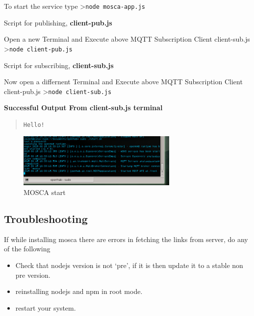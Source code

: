 \documentclass[16pt]{article}
\begin{document}
To start the service type \textgreater{}\texttt{node mosca-app.js}

\vspace{0.5cm}
Script for publishing, \textbf{client-pub.js}

Open a new Terminal and Execute above MQTT Subscription Client
client-sub.js \textgreater{}\texttt{node client-pub.js}

\vspace{0.5cm}
Script for subscribing, \textbf{client-sub.js}

Now open a differnent Terminal and Execute above MQTT Subscription
Client client-pub.js \textgreater{}\texttt{node client-sub.js}

\vspace{0.5cm}
\textbf{Successful Output From client-sub.js terminal}

\begin{quote}
\texttt{Hello!}
\end{quote}


\begin{figure}
\hspace{2cm}
\includegraphics[width=0.7\textwidth]{images/mosca.jpg}
\caption{MOSCA start}
\end{figure}

\vspace{0.5cm}

\subsection{Troubleshooting}


If while installing mosca there are errors in fetching the links from
server, do any of the following 

\begin{itemize}

\item Check that nodejs version is not
`pre', if it is then update it to a stable non pre version.
\item reinstalling nodejs and npm in root mode. 
\item restart your system.

\end{itemize}
\end{document}
